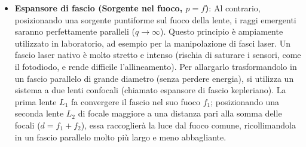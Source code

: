 \documentclass[openany,a4paper,12pt]{book}
\begin{document}
\begin{itemize}
    \item \textbf{Espansore di fascio (Sorgente nel fuoco, $p = f$)}: Al contrario, posizionando una sorgente puntiforme sul fuoco della lente, i raggi emergenti saranno perfettamente paralleli ($q \to \infty$). Questo principio è ampiamente utilizzato in laboratorio, ad esempio per la manipolazione di fasci laser. Un fascio laser nativo è molto stretto e intenso (rischia di saturare i sensori, come il fotodiodo, e rende difficile l'allineamento). 
    Per allargarlo trasformandolo in un fascio parallelo di grande diametro (senza perdere energia), si utilizza un sistema a due lenti confocali (chiamato espansore di fascio kepleriano). La prima lente $L_1$ fa convergere il fascio nel suo fuoco $f_1$; posizionando una seconda lente $L_2$ di focale maggiore a una distanza pari alla somma delle focali ($d = f_1 + f_2$), essa raccoglierà la luce dal fuoco comune, ricollimandola in un fascio parallelo molto più largo e meno abbagliante.
    
\begin{figure}[H]
\centering
{}
\end{figure}
\end{itemize}
\end{document}

